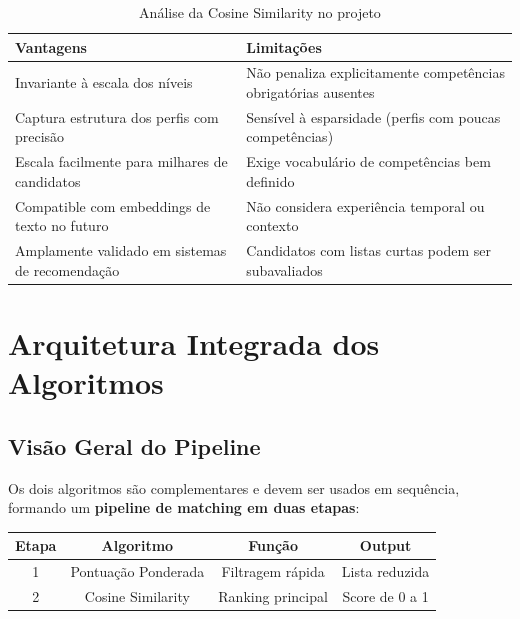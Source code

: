 \documentclass[12pt,a4paper]{article}
\begin{document}
\begin{table}[H]
\centering
\caption{Análise da Cosine Similarity no projeto}
\begin{tabular}{p{7cm} p{7cm}}
  \toprule
  \textbf{Vantagens} & \textbf{Limitações} \\
  \midrule
  Invariante à escala dos níveis & Não penaliza explicitamente competências obrigatórias ausentes \\
  Captura estrutura dos perfis com precisão & Sensível à esparsidade (perfis com poucas competências) \\
  Escala facilmente para milhares de candidatos & Exige vocabulário de competências bem definido \\
  Compatible com embeddings de texto no futuro & Não considera experiência temporal ou contexto \\
  Amplamente validado em sistemas de recomendação & Candidatos com listas curtas podem ser subavaliados \\
  \bottomrule
\end{tabular}
\end{table}

\newpage

\section{Arquitetura Integrada dos Algoritmos}

\subsection{Visão Geral do Pipeline}

Os dois algoritmos são complementares e devem ser usados em sequência, formando
um \textbf{pipeline de matching em duas etapas}:

\vspace{0.5cm}
\begin{center}
\begin{tabular}{|c|c|c|c|}
  \hline
  \textbf{Etapa} & \textbf{Algoritmo} & \textbf{Função} & \textbf{Output} \\
  \hline
  1 & Pontuação Ponderada & Filtragem rápida & Lista reduzida \\
  \hline
  2 & Cosine Similarity & Ranking principal & Score de 0 a 1 \\
  \hline
\end{tabular}
\end{center}
\vspace{0.5cm}
\end{document}
